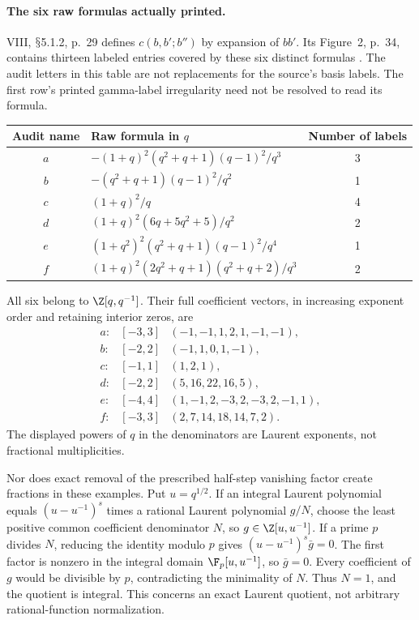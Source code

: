 \documentclass[11pt,a4paper]{article}
\renewcommand{\S}{\ensuremath{\mathsection}}
\theoremstyle{named}\newtheorem{finding}{Finding}[section]
\theoremstyle{definition}\newtheorem{definition}[finding]{Definition}
\theoremstyle{remark}\newtheorem{remark}[finding]{Remark}
\begin{document}
\paragraph{The six raw formulas actually printed.}
VIII, \S5.1.2, p.~29 defines
\(c(b,b';b'')\) by expansion of \(bb'\).
Its Figure~2, p.~34, contains thirteen labeled
entries covered by these six distinct formulas
\cite{VIII}. The audit letters in this table
are not replacements for the source's basis labels.
The first row's printed gamma-label irregularity
need not be resolved to read its formula.
\begin{center}
\begin{tabular}{c l c}
\toprule
Audit name & Raw formula in \(q\) & Number of labels\\
\midrule
\(a\)&\(- (1+q)^2(q^2+q+1)(q-1)^2/q^3\)&3\\[3pt]
\(b\)&\(- (q^2+q+1)(q-1)^2/q^2\)&1\\[3pt]
\(c\)&\((1+q)^2/q\)&4\\[3pt]
\(d\)&\((1+q)^2(6q+5q^2+5)/q^2\)&2\\[3pt]
\(e\)&\((1+q^2)^2(q^2+q+1)(q-1)^2/q^4\)&1\\[3pt]
\(f\)&\((1+q)^2(2q^2+q+1)(q^2+q+2)/q^3\)&2\\
\bottomrule
\end{tabular}
\end{center}
All six belong to \(\Z[q,q^{-1}]\).
Their full coefficient vectors, in increasing
exponent order and retaining interior zeros, are
\[
\begin{array}{ccl}
a:&[-3,3]&(-1,-1,1,2,1,-1,-1),\\
b:&[-2,2]&(-1,1,0,1,-1),\\
c:&[-1,1]&(1,2,1),\\
d:&[-2,2]&(5,16,22,16,5),\\
e:&[-4,4]&(1,-1,2,-3,2,-3,2,-1,1),\\
f:&[-3,3]&(2,7,14,18,14,7,2).
\end{array}
\]
The displayed powers of \(q\) in the denominators
are Laurent exponents, not fractional multiplicities.

Nor does exact removal of the prescribed
half-step vanishing factor create fractions in
these examples. Put \(u=q^{1/2}\).
If an integral Laurent polynomial equals
\((u-u^{-1})^s\) times a rational Laurent
polynomial \(g/N\), choose the least positive
common coefficient denominator \(N\), so
\(g\in\Z[u,u^{-1}]\).
If a prime \(p\) divides \(N\), reducing the
identity modulo \(p\) gives
\((u-u^{-1})^s\bar g=0\).
The first factor is nonzero in the integral
domain \(\F_p[u,u^{-1}]\), so \(\bar g=0\).
Every coefficient of \(g\) would be divisible
by \(p\), contradicting the minimality of \(N\).
Thus \(N=1\), and the quotient is integral.
This concerns an exact Laurent quotient, not
arbitrary rational-function normalization.
\end{document}
